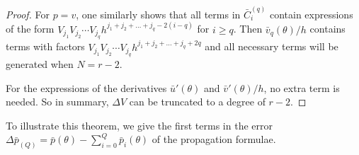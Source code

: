 \begin{proof}
    For $p=v$, one similarly shows that all terms in $\bar{C}_i^{(q)}$ contain expressions of the form $ V_{j_1} V_{j_2} \cdots V_{j_q} h^{j_1+j_2+\ldots+j_q - 2 (i-q)}$ for $i \geq q$. Then $\bar{v}_q(\theta)/h$ contains terms with factors $ V_{j_1} V_{j_2} \cdots V_{j_q} h^{j_1+j_2+\ldots+j_q+ 2 q}$ and all necessary terms will be generated when $N = r-2$.

    For the expressions of the derivatives $\bar{u}'(\theta)$ and $\bar{v}'(\theta)/h$, no extra term is needed. So in summary, $\Delta V$ can be truncated to a degree of $r - 2$.

\end{proof}

To illustrate this theorem, we give the first terms in the error $\Delta \bar{p}_{(Q)} = \bar{p}(\theta) - \displaystyle\sum_{i=0}^{Q} \bar{p}_{i}(\theta)$  of the propagation formulae.

